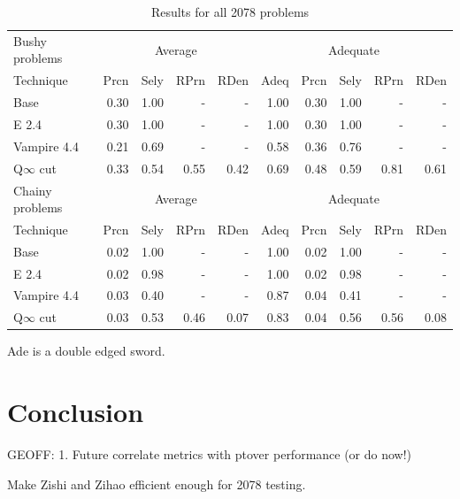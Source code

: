 \documentclass[EPiC]{easychair}
\begin{document}
\begin{table}[hbt]
\begin{center}
\begin{tabular}{|l|rrrr|r|rrrr|}
\hline
Bushy problems  & \multicolumn{4}{|c|}{Average} & \multicolumn{5}{|c|}{Adequate} \\
Technique       & Prcn & Sely & RPrn & RDen & Adeq & Prcn & Sely & RPrn & RDen \\
\hline
Base            & 0.30 & 1.00 &  -   &  -   & 1.00 & 0.30 & 1.00 &  -   &  -   \\
E 2.4           & 0.30 & 1.00 &  -   &  -   & 1.00 & 0.30 & 1.00 &  -   &  -   \\
Vampire 4.4     & 0.21 & 0.69 &  -   &  -   & 0.58 & 0.36 & 0.76 &  -   &  -   \\
Q$\infty$ cut   & 0.33 & 0.54 & 0.55 & 0.42 & 0.69 & 0.48 & 0.59 & 0.81 & 0.61 \\
\hline
Chainy problems & \multicolumn{4}{|c|}{Average} & \multicolumn{5}{|c|}{Adequate} \\
Technique       & Prcn & Sely & RPrn & RDen & Adeq & Prcn & Sely & RPrn & RDen \\
\hline
Base            & 0.02 & 1.00 &  -   &  -   & 1.00 & 0.02 & 1.00 &  -   &  -   \\
E 2.4           & 0.02 & 0.98 &  -   &  -   & 1.00 & 0.02 & 0.98 &  -   &  -   \\
Vampire 4.4     & 0.03 & 0.40 &  -   &  -   & 0.87 & 0.04 & 0.41 &  -   &  -   \\
Q$\infty$ cut   & 0.03 & 0.53 & 0.46 & 0.07 & 0.83 & 0.04 & 0.56 & 0.56 & 0.08 \\
\hline
\end{tabular}
\caption{Results for all 2078 problems}
\label{Results2078}
\end{center}
\end{table}

Ade is a double edged sword.


\section{Conclusion}
\label{Conclusion}

GEOFF:
1. Future correlate metrics with ptover performance (or do now!)

Make Zishi and Zihao efficient enough for 2078 testing.

\label{sect:bib}


\end{document}
